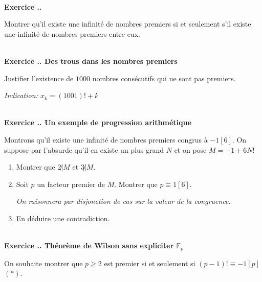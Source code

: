 \documentclass{article}
\newcommand{\mb}[1]{\mathbb{#1}}
\newcounter{exo}
\newcommand{\exercice}[1][\null]{\textbf{\\ Exercice \thesection.\theexo. #1} \addtocounter{exo}{1}}
\begin{document}
\exercice

Montrer qu'il existe une infinité de nombres premiers si et seulement s'il existe une infinité de nombres premiers entre eux.

\exercice[Des trous dans les nombres premiers]

Justifier l'existence de $1 000$ nombres consécutifs 
qui ne sont pas premiers.

\emph{Indication: $x_k = (1001)! + k$}




\exercice[Un exemple de progression arithmétique]

Montrons qu'il existe une infinité de nombres premiers congrus à $-1[6]$. On suppose par l'absurde qu'il en existe un plus grand $N$ et on pose $M = -1 + 6 N!$

\begin{enumerate}

\item Montrer que $2 \not | M$ et $3 \not | M$.

\item Soit $p$ un facteur premier de $M$. Montrer que $p \equiv 1[6]$.

 \emph{On raisonnera par disjonction de cas sur la valeur de la congruence.}


\item En déduire une contradiction.

\end{enumerate}



\exercice[Théorème de Wilson sans expliciter $\mb{F}_p$]

On souhaite montrer que $p \ge 2$ est premier si et seulement si $(p-1)! \equiv -1 [p]$ $(*)$.
\end{document}
